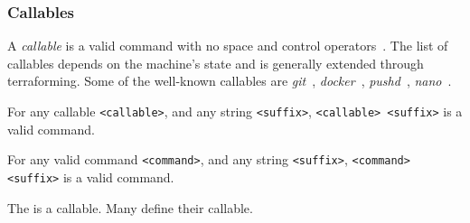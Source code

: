 \subsubsection{Callables}\label{callables}

A \emph{callable} is a valid command with no space and control operators~\cite{control_operators}. The list of callables depends on the machine's state and is generally extended through terraforming. Some of the well-known callables are \emph{git}~\cite{git}, \emph{docker}~\cite{docker}, \emph{pushd}~\cite{pushd}, \emph{nano}~\cite{nano}. 

\begin{theorem}
For any callable \texttt{<callable>}, and any string \texttt{<suffix>}, \texttt{<callable> <suffix>} is a valid command.
\end{theorem}

\begin{theorem}
For any valid command \texttt{<command>}, and any string \texttt{<suffix>}, \texttt{<command> <suffix>} is a valid command.
\end{theorem}

The  is a callable. Many  define their callable. 